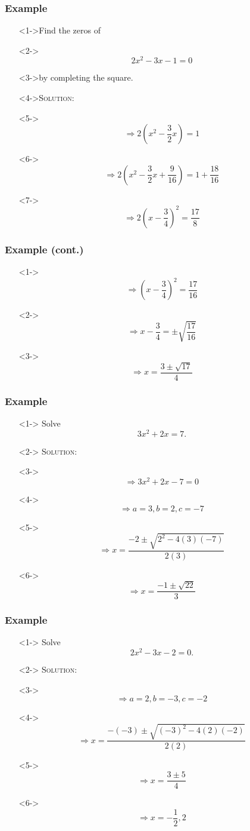 \documentclass[handout]{beamer}
\begin{document}
\begin{frame}
	\frametitle{Example} 
	\begin{enumerate}
		\item[]<1->Find the zeros of 
		\item[]<2-> \[ 2x^{2}-3x-1=0 \] 
		\item[]<3->by completing the square. 
		\item[]<4->\textsc{Solution:} 
		\item[]<5->\[ \Rightarrow 2\left( x^{2}-\frac{3}{2}x\right)=1\]
		\item[]<6->\[ \Rightarrow 2\left( x^{2}-\frac{3}{2}x+\frac{9}{16}\right)=1+\frac{18}{16} \] 
		\item[]<7-> \[ \Rightarrow 2\left( x-\frac{3}{4} \right)^{2}=\frac{17}{8} \]
	\end{enumerate}
\end{frame}

\begin{frame}
	\frametitle{Example (cont.)} 
	\begin{enumerate}
		\item[]<1-> \[ \Rightarrow \left( x-\frac{3}{4} \right)^{2}=\frac{17}{16} \] 
		\item[]<2-> \[ \Rightarrow x-\frac{3}{4}=\pm \sqrt{\frac{17}{16}}\] 
		\item[]<3-> \[ \Rightarrow x=\frac{3 \pm \sqrt{17}}{4}  \]
	\end{enumerate}
\end{frame}

\begin{frame}
	\frametitle{Example} 
	\begin{enumerate}
		\item[]<1-> Solve \[ 3x^{2}+2x=7. \] 
		\item[]<2-> \textsc{Solution:} 
		\item[]<3-> \[ \Rightarrow 3x^{2}+2x-7=0 \] 
		\item[]<4-> \[ \Rightarrow a=3, b=2, c=-7 \] 
		\item[]<5-> \[ \Rightarrow x=\frac{-2 \pm \sqrt{2^{2}-4(3)(-7)}}{2(3)}\]
		\item[]<6-> \[ \Rightarrow x=\frac{-1 \pm \sqrt{22}}{3}\]
	\end{enumerate}
\end{frame}

\begin{frame}
	\frametitle{Example}
	\begin{enumerate}
		\item[]<1-> Solve \[ 2x^{2}-3x-2=0. \] 
		\item[]<2-> \textsc{Solution:} 
		\item[]<3-> \[ \Rightarrow a=2, b=-3, c=-2 \]
		\item[]<4-> \[ \Rightarrow  x=\frac{-(-3)\pm \sqrt{(-3)^{2}-4(2)(-2)}}{2(2)}\]  
		\item[]<5-> \[ \Rightarrow x=\frac{3 \pm 5}{4}\]
		\item[]<6-> \[ \Rightarrow x=-\frac{1}{2}, 2\]
	\end{enumerate}
\end{frame}
\end{document}
